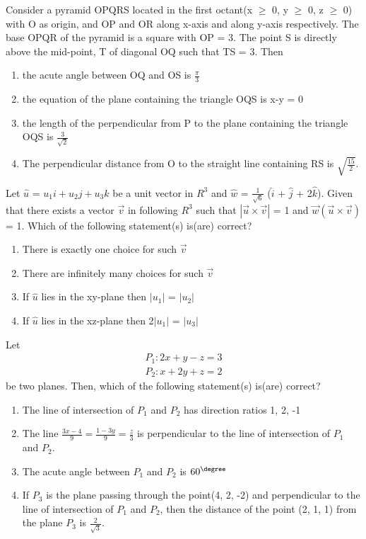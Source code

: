 \item Consider a pyramid OPQRS located in the first octant(x $\geq$ 0, y $\geq$ 0, z $\geq$ 0) with O as origin, and OP and OR along x-axis and along y-axis respectively. The base OPQR of the pyramid is a square with OP = 3. The point S is directly above the mid-point, T of diagonal OQ such that TS = 3. Then
\begin{enumerate}
\item the acute angle between OQ and OS is $\frac{\pi}{3}$
\item the equation of the plane containing the triangle OQS is x-y = 0
\item the length of the perpendicular from P to the plane containing the triangle OQS is $\frac{3}{\sqrt{2}}$
\item The perpendicular distance from O to the straight line containing RS is $\sqrt{\frac{15}{2}}$.
\end{enumerate}

\item Let $\hat{u}$ = $u_{1}i + u_{2}j + u_{3}k$ be a unit vector in $R^{3}$ and $\hat{w}$ = $\frac{1}{\sqrt{6}}$
($\hat{i}$ + $\hat{j}$ + 2$\hat{k}$). Given that there exists a vector $\overrightarrow{v}$ in following $R^{3}$ such that $|\overrightarrow{u} \times \overrightarrow{v}|$ = 1 and $\overrightarrow{w}(\overrightarrow{u} \times \overrightarrow{v})$ = 1. Which of the following statement(s) is(are) correct?
\begin{enumerate}
\item There is exactly one choice for such $\overrightarrow{v}$
\item There are infinitely many choices for such $\overrightarrow{v}$
\item If $\hat{u}$ lies in the xy-plane then $|u_1|$ = $|u_2|$
\item If $\hat{u}$ lies in the xz-plane then 2$|u_1|$ = $|u_3|$
\end{enumerate}

\item Let 
\begin{align*}
P_1: 2x + y - z = 3
\end{align*}
\begin{align*}
P_2: x + 2y + z = 2
\end{align*}
be two planes. Then, which of the following statement(s) is(are) correct?
\begin{enumerate}
\item The line of intersection of $P_1$ and $P_2$ has direction ratios 1, 2, -1
\item The line $\frac{3x - 4}{9} = \frac{1 - 3y}{9} = \frac{z}{3}$ is perpendicular to the line of intersection of $P_1$ and $P_2$.
\item The acute angle between $P_1$ and $P_2$ is $60^{\degree}$
\item If $P_3$ is the plane passing through the point(4, 2, -2) and perpendicular to the line of intersection of $P_1$ and $P_2$, then the distance of the point (2, 1, 1) from the plane $P_3$ is $\frac{2}{\sqrt{3}}$.
\end{enumerate}

